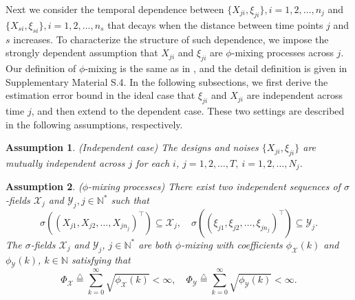\documentclass[12pt]{article}
\newtheorem{assump}{Assumption}
\begin{document}
Next we consider the temporal dependence between $\{X_{ji},\xi_{ji}\},i=1,2,\dots,n_j$ and $\{X_{si},\xi_{si}\},i=1,2,\dots,n_s$ that decays when the distance between time points $j$ and $s$ increases. %
  To characterize the structure of such dependence, we impose the strongly dependent assumption that $X_{j i}$ and $\xi_{j i}$ are $\phi$-mixing processes across $j$.
  Our definition of $\phi$-mixing is the same as in \cite{doukhan2012mixing}, and the detail definition is given in Supplementary Material S.4. In the following subsections, we first derive the estimation error bound in the ideal case that $\xi_{ji}$ and $X_{ji}$ are independent across time $j$, and then extend to the dependent case. These two settings are described in the following assumptions, respectively.

  \begin{assump}\label{assump_indpdt}
  (Independent case) The designs and noises $\{X_{ji},\xi_{ji}\}$ are mutually independent across $j$ for each $i$, $ j=1,2,\dots,T,\ i=1,2,\dots,N_j$.
  \end{assump}

  \begin{assump}
  \label{assump_phi_mixing}
  ($\phi$-mixing processes)
  There exist two independent sequences of $\sigma$-fields $\mathcal{X}_j$ and $\mathcal{Y}_j,j\in \mathbb{N}^*$ such that $$\sigma((X_{j1},X_{j2},\dots,X_{jn_j})^\top) \subseteq \mathcal{X}_j,\quad  \sigma((\xi_{j1},\xi_{j2},\dots,\xi_{jn_j})^\top)\subseteq\mathcal{Y}_j.$$
  The $\sigma$-fields  $\mathcal{X}_j$ and $\mathcal{Y}_j$, $j\in \mathbb{N}^*$ are both $\phi$-mixing with coefficients $\phi_{\mathcal{X}}(k)$ and $\phi_{\mathcal{Y}}(k)$, $k\in \mathbb{N}$ satisfying that  $$\Phi_\mathcal{X}  \overset{\triangle}{=} \sum_{k=0}^\infty \sqrt{\phi_\mathcal{X}(k)}< \infty,\quad \Phi_\mathcal{Y}\overset{\triangle}{=} \sum_{k=0}^\infty \sqrt{\phi_\mathcal{Y}(k)}< \infty.$$
  \end{assump}
\end{document}
